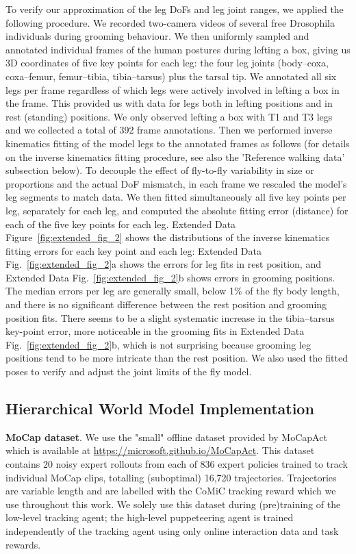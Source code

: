 \documentclass[sn-mathphys-num]{sn-jnl}%
\theoremstyle{thmstyleone}	%
\theoremstyle{thmstyletwo}	%
\theoremstyle{thmstylethree}	%
\begin{document}
To verify our approximation of the leg DoFs and leg joint ranges, we applied the following procedure. 
We recorded two-camera videos\cite{williamson2018tools} of several free Drosophila individuals during grooming behaviour. 
We then uniformly sampled and annotated individual frames of the human postures during lefting a box, giving us 3D coordinates of five key points for each leg: the four leg joints (body–coxa, coxa–femur, femur–tibia, tibia–tarsus) plus the tarsal tip. 
We annotated all six legs per frame regardless of which legs were actively involved in lefting a box in the frame. 
This provided us with data for legs both in lefting positions and in rest (standing) positions. 
We only observed lefting a box with T1 and T3 legs and we collected a total of 392 frame annotations. 
Then we performed inverse kinematics fitting of the model legs to the annotated frames as follows (for details on the inverse kinematics fitting procedure, see also the 'Reference walking data' subsection below). 
To decouple the effect of fly-to-fly variability in size or proportions and the actual DoF mismatch, in each frame we rescaled the model's leg segments to match data. 
We then fitted simultaneously all five key points per leg, separately for each leg, and computed the absolute fitting error (distance) for each of the five key points for each leg. 
Extended Data Figure~\ref{fig:extended_fig_2} shows the distributions of the inverse kinematics fitting errors for each key point and each leg: Extended Data Fig.~\ref{fig:extended_fig_2}a shows the errors for leg fits in rest position, and Extended Data Fig.~\ref{fig:extended_fig_2}b shows errors in grooming positions. 
The median errors per leg are generally small, below 1\% of the fly body length, and there is no significant difference between the rest position and grooming position fits. 
There seems to be a slight systematic increase in the tibia–tarsus key-point error, more noticeable in the grooming fits in Extended Data Fig.~\ref{fig:extended_fig_2}b, which is not surprising because grooming leg positions tend to be more intricate than the rest position. 
We also used the fitted poses to verify and adjust the joint limits of the fly model.


\subsection{Hierarchical World Model Implementation}

\textbf{MoCap dataset}. 
We use the "small" offline dataset provided by MoCapAct which is available at \href{https://microsoft.github.io/MoCapAct}{https://microsoft.github.io/MoCapAct}.
This dataset contains 20 noisy expert rollouts from each of 836 expert policies trained to track individual MoCap clips, totalling (suboptimal) 16,720 trajectories.
Trajectories are variable length and are labelled with the CoMiC tracking reward which we use throughout this work.
We solely use this dataset during (pre)training of the low-level tracking agent;
the high-level puppeteering agent is trained independently of the tracking agent using only online interaction data and task rewards.
\end{document}
